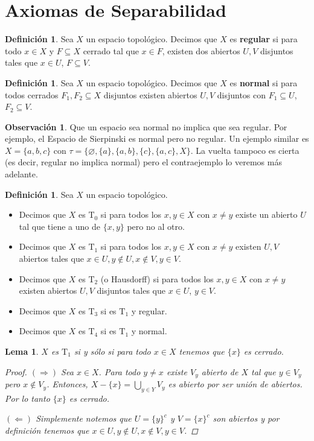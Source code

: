 \documentclass[12pt]{book}
\newtheorem{lem}[teo]{Lema}
\theoremstyle{definition}
\newtheorem{obs}[teo]{Observación}
\newtheorem{defn}[teo]{Definición}
\let\emptyset\varnothing
\begin{document}
\section{Axiomas de Separabilidad}

\begin{defn}
Sea $X$ un espacio topológico. Decimos que $X$ es \textbf{regular} si para todo $x\in X$ y $F\subseteq X$ cerrado tal que $x\in F$, existen dos abiertos $U,V$ disjuntos tales que $x\in U$, $F\subseteq V$.
\end{defn}

\begin{defn}
Sea $X$ un espacio topológico. Decimos que $X$ es \textbf{normal} si para todos cerrados $F_1,F_2\subseteq X$ disjuntos existen abiertos $U,V$ disjuntos con $F_1\subseteq U$, $F_2\subseteq V$.
\end{defn}

\begin{obs}
Que un espacio sea normal no implica que sea regular. Por ejemplo, el Espacio de Sierpinski es normal pero no regular. Un ejemplo similar es $X=\{a,b,c\}$ con $\tau = \{\emptyset, \{a\}, \{a,b\}, \{c\}, \{a,c\},X\}$. La vuelta tampoco es cierta (es decir, regular no implica normal) pero el contraejemplo lo veremos más adelante.
\end{obs}

\begin{defn}
Sea $X$ un espacio topológico.
\begin{itemize}\item Decimos que $X$ es $\mathrm{T}_0$ si para todos los $x,y\in X$ con $x\neq y$ existe un abierto $U$ tal que tiene a uno de $\{x,y\}$ pero no al otro.
\item Decimos que $X$ es $\mathrm{T}_1$ si para todos los $x,y\in X$ con $x\neq y$ existen $U,V$ abiertos tales que $x\in U, y\notin U, x\notin V, y\in V$.
\item Decimos que $X$ es $\mathrm{T}_2$ (o Hausdorff) si para todos los $x,y\in X$ con $x\neq y$ existen abiertos $U,V$ disjuntos tales que $x\in U$, $y\in V$.
\item Decimos que $X$ es $\mathrm{T}_3$ si es $\mathrm{T}_1$ y regular.
\item Decimos que $X$ es $\mathrm{T}_4$ si es $\mathrm{T}_1$ y normal.
\end{itemize}
\end{defn}

\begin{lem}
$X$ es $\mathrm{T}_1$ si y sólo si para todo $x\in X$ tenemos que $\{x\}$ es cerrado.
\begin{proof}
$(\Longrightarrow)$ Sea $x\in X$. Para todo $y\neq x$ existe $V_y$ abierto de $X$ tal que $y\in V_y$ pero $x\notin V_y$. Entonces, $X-\{x\} = \displaystyle\bigcup_{y\in Y}V_y$ es abierto por ser unión de abiertos. Por lo tanto $\{x\}$ es cerrado.

$(\Longleftarrow)$ Simplemente notemos que $U = \{y\}^c$ y $V = \{x\}^c$ son abiertos y por definición tenemos que $x\in U, y\notin U, x\notin V, y\in V$.
\end{proof}
\end{lem}
\end{document}
